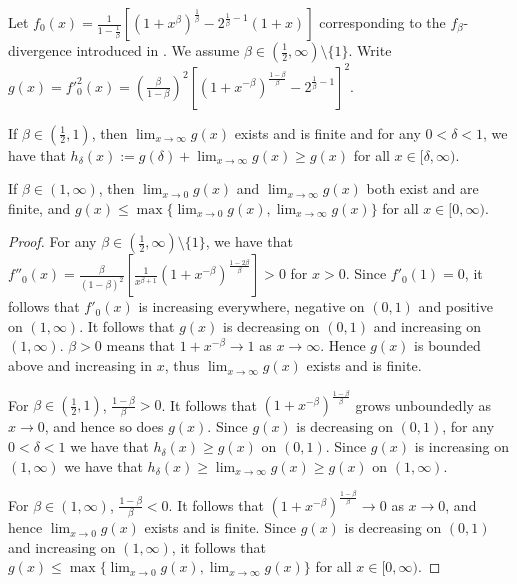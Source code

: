 \begin{lemma}\label{lemma:upper-bound-f-beta}
Let $f_0(x) = \frac{1}{1-\frac{1}{\beta}}\left[ \left(1+x^\beta\right)^\frac{1}{\beta}  - 2^{\frac{1}{\beta} - 1}(1+x)\right]$
corresponding to the ${f_\beta}$-divergence introduced in \cite{osterreicher2003new}.
We assume $\beta \in \left( \frac{1}{2}, \infty\right) \setminus \{1\}$.
Write $g(x) = f'^2_0(x) = \left(\frac{\beta}{1-\beta}\right)^2\left[ \left(1+x^{-\beta}\right)^\frac{1-\beta}{\beta}  - 2^{\frac{1}{\beta} - 1}\right]^2$.

If $\beta \in \left(\frac{1}{2}, 1\right)$, then $\lim_{x\to \infty}g(x)$ exists and is finite and for any $0<\delta<1$, we have that $h_\delta(x) := g(\delta) + \lim_{x\to \infty}g(x) \geq g(x)$ for all $x\in[\delta, \infty)$.

If $\beta \in \left(1, \infty \right)$, then $\lim_{x\to0}g(x)$ and $\lim_{x\to \infty}g(x)$ both exist and are finite, and $g(x) \leq \max\{\lim_{x\to0}g(x), \lim_{x\to \infty}g(x)\}$ for all $x\in[0, \infty)$.
\end{lemma}
\begin{proof}
For any $\beta \in \left( \frac{1}{2}, \infty\right) \setminus \{1\}$, we have that $f''_0(x) = \frac{\beta}{(1-\beta)^2} \left[ 
\frac{1}{x^{\beta+1}} \left( 1 + x^{-\beta}\right)^{\frac{1-2\beta}{\beta}}\right] > 0$ for $x>0$.
Since $f'_0(1)=0$, it follows that $f'_0(x)$ is increasing everywhere, negative on $(0,1)$ and positive on $(1,\infty)$.
It follows that $g(x)$ is decreasing on $(0,1)$ and increasing on $(1,\infty)$.
$\beta > 0$ means that $1+x^{-\beta} \to 1$ as $x\to \infty$. Hence $g(x)$ is bounded above and increasing in $x$, thus $\lim_{x\to\infty} g(x)$ exists and is finite.

For $\beta \in (\frac{1}{2}, 1)$, $\frac{1-\beta}{\beta} > 0$. 
It follows that $\left(1+x^{-\beta}\right)^\frac{1-\beta}{\beta}$ grows unboundedly as $x \to 0$, and hence so does $g(x)$.
Since $g(x)$ is decreasing on $(0,1)$, for any $0<\delta<1$ we have that $h_\delta(x)\geq g(x)$ on $(0,1)$.
Since $g(x)$ is increasing on $(1, \infty)$ we have that $h_\delta(x) \geq \lim_{x\to\infty} g(x) \geq g(x)$ on $(1,\infty)$.

For $\beta \in (1, \infty)$, $\frac{1-\beta}{\beta} < 0$. 
It follows that $\left(1+x^{-\beta}\right)^\frac{1-\beta}{\beta} \to 0$ as $x \to 0$, and hence $\lim_{x\to 0}g(x)$ exists and is finite.
Since $g(x)$ is decreasing on $(0,1)$ and increasing on $(1,\infty)$, it follows that 
$g(x) \leq \max\{\lim_{x\to 0}g(x), \lim_{x\to \infty}g(x)\}$ for all $x\in [0, \infty)$.
\end{proof}


